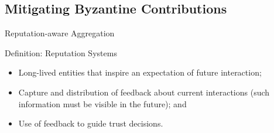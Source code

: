 \subsection{Mitigating Byzantine Contributions}

\begin{frame}{Reputation-aware Aggregation}

  \begin{block}{Definition: Reputation Systems\normalfont~\autocite{resnick_Reputationsystems_2000}}
    \begin{itemize}
      \item Long-lived entities that inspire an expectation of future interaction;
      \item Capture and distribution of feedback about current interactions (such information must be visible in the future); and
      \item Use of feedback to guide trust decisions.
    \end{itemize}
  \end{block}



\end{frame}

